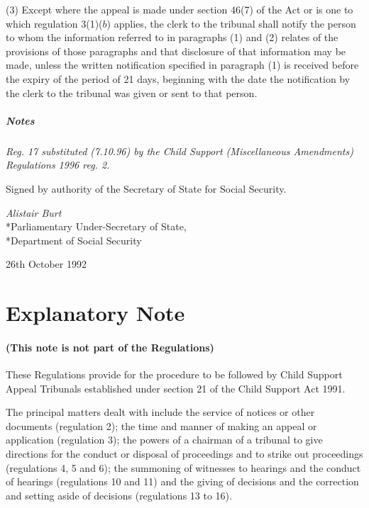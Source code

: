 \documentclass[a4paper]{article}
\newcommand{\parthead}{}
\newcommand\amendment[1]{\subsubsection*{Notes}{\itshape\frenchspacing\footnotesize #1 \par}}
\begin{document}
(3) Except where the appeal is made under section 46(7) of the Act or is one to which regulation 3(1)($b$) applies, the clerk to the tribunal shall notify the person to whom the information referred to in paragraphs (1) and (2) relates of the provisions of those paragraphs and that disclosure of that information may be made, unless the written notification specified in paragraph (1) is received before the expiry of the period of 21 days, beginning with the date the notification by the clerk to the tribunal was given or sent to that person.

\amendment{
Reg. 17 substituted (7.10.96) by the Child Support (Miscellaneous Amendments) Regulations 1996 reg. 2.
}

\bigskip

Signed by authority of the Secretary of State for Social Security.

{\raggedleft
\emph{Alistair Burt}\\*Parliamentary Under-Secretary of State,\\*Department of Social Security

}

26th October 1992

\part{Explanatory Note}

\renewcommand\parthead{--- Explanatory Note}

\subsection*{(This note is not part of the Regulations)}

 These Regulations provide for the procedure to be followed by Child Support Appeal Tribunals established under section 21 of the Child Support Act 1991.

  The principal matters dealt with include the service of notices or other documents (regulation 2); the time and manner of making an appeal or application (regulation 3); the powers of a chairman of a tribunal to give directions for the conduct or disposal of proceedings and to strike out proceedings (regulations 4, 5 and 6); the summoning of witnesses to hearings and the conduct of hearings (regulations 10 and 11) and the giving of decisions and the correction and setting aside of decisions (regulations 13 to 16).
\end{document}
